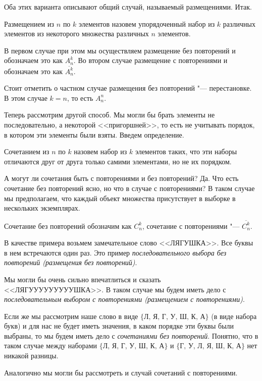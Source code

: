 Оба этих варианта описывают общий случай, называемый размещениями. Итак.

\begin{definition}
    Размещением из $n$ по $k$ элементов назовем упорядоченный набор
    из $k$ различных элементов из некоторого множества различных $n$ элементов.
\end{definition}

В первом случае при этом мы осуществляем размещение без повторений
и обозначаем это как $A_n^k$. Во втором случае размещение с повторениями
и обозначаем это как $\overline{A_n^k}$.

Стоит отметить о частном случае размещения без повторений "--- перестановке.
В этом случае $k = n$, то есть $A_n^n$.

Теперь рассмотрим другой способ. Мы могли бы брать элементы не последовательно,
а некоторой <<пригоршней>>, то есть не учитывать порядок, в котором эти
элементы были взяты. Введем определение.

\begin{definition}
    Сочетанием из $n$ по $k$ назовем набор из $k$ элементов таких, что
    эти наборы отличаются друг от друга только самими элементами, но не их
    порядком.
\end{definition}

А могут ли сочетания быть с повторениями и без повторений? Да. Что есть 
сочетание без повторений ясно, но что в случае с повторениями? В таком случае
мы предполагаем, что каждый объект множества присутствует в выборке в нескольких
экземплярах.

Сочетание без повторений обозначим как $C_n^k$, сочетание с повторениями 
"--- $\overline{C_n^k}$.

\begin{example}
    В качестве примера возьмем замечательное слово <<ЛЯГУШКА>>. Все буквы
    в нем встречаются один раз. Это пример \textit{последовательного выбора без повторений (размещения без повторений)}.
    
    Мы могли бы очень сильно впечатлиться и сказать <<ЛЯГУУУУУУУУУШКА>>.
    В таком случае мы будем иметь дело с \textit{последовательным выбором с повторениями (размещением с повторениями)}.
    
    Если же мы рассмотрим наше слово в виде $\{\text{Л, Я, Г, У, Ш, К, А}\}$ (в виде набора букв)
    и для нас не будет иметь значения, в каком порядке эти буквы были выбраны, то мы будем
    иметь дело с \textit{сочетаниями без повторений}. 
    Понятно, что в таком случае между
    наборами $\{\text{Л, Я, Г, У, Ш, К, А}\}$ и $\{\text{Г, У, Л, Я, Ш, К, А}\}$ нет никакой разницы.
    
    Аналогично мы могли бы рассмотреть и случай сочетаний с повторениями.
\end{example}

